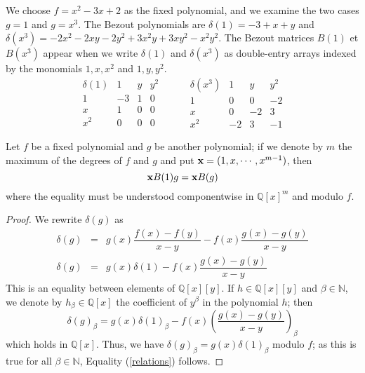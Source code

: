 \documentclass{standalone}
\begin{document}
\begin{exmp}
\label{exmp_1}
We choose $f = x^2 - 3x + 2$ as the fixed polynomial, and we examine the two cases $g=1$ and $g = x^3$. 
The Bezout polynomials are $\delta(1) = -3 + x + y$ and $\delta(x^3) = -2x^2 - 2xy -2y^2 + 3x^2y + 3xy^2 -x^2y^2$. 
The Bezout matrices $B(1)$ et $B(x^3)$ appear when we write  $\delta(1)$ and  $\delta(x^3)$ as double-entry arrays indexed by the monomials $1, x, x^2$ and $1, y, y^2$.
$$
\begin{array}{c|ccc}
\delta(1) & 1 & y & y^2\\
\hline
1 & -3 & 1 & 0\\
x & 1 & 0 & 0\\
x^2 & 0 & 0 & 0
\end{array}
\hspace{1cm}
\begin{array}{c|ccc}
\delta(x^3) & 1 & y & y^2\\
\hline
1 & 0 & 0 & -2\\
x & 0 & -2 & 3\\
x^2 & -2 & 3 & -1
\end{array}
$$
\end{exmp}

\begin{prop}
\label{relations_prop}
Let $f$ be a fixed polynomial and $g$ be another polynomial; if we denote by $m$ the maximum of the degrees of $f$ and $g$ and put $\bold{x} = (1, x,\cdots, x^{m-1})$, then
\begin{equation}
\label{relations}
	\bold{x}B(1)g = \bold{x}B(g)
\end{equation}
where the equality must be understood componentwise in $\mathbb{Q}[x]^m$ and modulo $f$.
\end{prop}
\begin{proof}
We rewrite $\delta(g)$ as
\begin{align*}
	\delta(g) & = & g(x)\dfrac{f(x)-f(y)}{x-y} - f(x)\dfrac{g(x)-g(y)}{x-y} \\ \nonumber
	\delta(g) & = & g(x)\delta(1) - f(x)\dfrac{g(x)-g(y)}{x-y}
\end{align*}
This is an equality between elements of $\mathbb{Q}[x][y]$. 
If $h\in \mathbb{Q}[x][y]$ and $\beta\in\mathbb{N}$, we denote by $h_\beta \in \mathbb{Q}[x]$ the coefficient of $y^\beta$ in the polynomial $h$; then
$$\delta(g)_\beta = g(x)\delta(1)_\beta - f(x)\left(\dfrac{g(x)-g(y)}{x-y}\right)_\beta$$
which holds in $\mathbb{Q}[x]$. Thus, we have $\delta(g)_\beta = g(x)\delta(1)_\beta$ modulo $f$; as this is true for all $\beta\in\mathbb{N}$, Equality (\ref{relations}) follows.
\end{proof}
\end{document}
